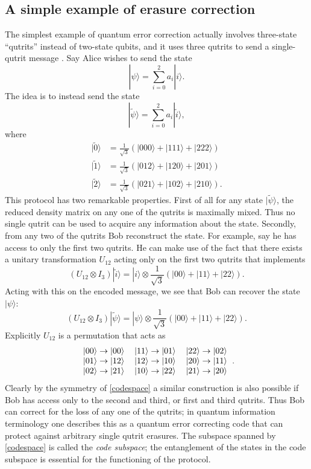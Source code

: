 \documentclass[11pt]{article}
\newcommand{\be}{\begin{equation}}
\newcommand{\ee}{\end{equation}}
\newcommand{\ran}{\rangle}
\newcommand{\wt}{\widetilde}
\begin{document}
\subsection{A simple example of erasure correction}\label{examplesec}
The simplest example of quantum error correction actually involves three-state ``qutrits'' instead of two-state qubits, and it uses three qutrits to send a single-qutrit message \cite{Cleve:1999qg}.  Say Alice wishes to send the state
\be
|\psi\ran=\sum_{i=0}^2 a_i |i\ran.  
\ee
The idea is to instead send the state
\be
|\wt{\psi}\ran=\sum_{i=0}^2 a_i |\wt{i}\ran,
\ee
where
\begin{align}\nonumber
|\wt{0}\ran&=\frac{1}{\sqrt{3}}\left(|000\ran+|111\ran+|222\ran\right)\\\label{codespace}
|\wt{1}\ran&=\frac{1}{\sqrt{3}}\left(|012\ran+|120\ran+|201\ran\right)\\\nonumber
|\wt{2}\ran&=\frac{1}{\sqrt{3}}\left(|021\ran+|102\ran+|210\ran\right).
\end{align} 
This protocol has two remarkable properties.  First of all for any state $|\wt{\psi}\ran$, the reduced density matrix on any one of the qutrits is maximally mixed.  Thus no single qutrit can be used to acquire any information about the state.  Secondly, from any two of the qutrits Bob  reconstruct the state.  For example, say he has access to only the first two qutrits.  He can make use of the fact that there exists a unitary transformation $U_{12}$ acting only on the first two qutrits that implements 
\be\label{U12}
\left(U_{12}\otimes I_3\right)|\wt{i}\ran=|i\ran\otimes \frac{1}{\sqrt{3}}\left(|00\ran+|11\ran+|22\ran\right).
\ee
Acting with this on the encoded message, we see that Bob can recover the state $|\psi\ran$: 
\be
\left(U_{12}\otimes I_3\right)|\wt{\psi}\ran=|\psi\ran\otimes \frac{1}{\sqrt{3}}\left(|00\ran+|11\ran+|22\ran\right).
\ee
Explicitly $U_{12}$ is a permutation that acts as
\be
\begin{tabular}{ l c r }
$|00\ran\to|00\ran$ & $|11\ran \to |01\ran$ & $|22\ran\to |02\ran$ \\
$|01\ran \to |12\ran$ & $|12\ran \to |10\ran$ & $|20\ran \to |11\ran$ \\
$|02\ran\to |21\ran$ & $|10\ran\to|22\ran$ & $|21\ran \to |20\ran$ \\
\end{tabular}.
\ee
Clearly by the symmetry of \eqref{codespace} a similar construction is also possible if Bob has access only to the second and third, or first and third qutrits.  Thus Bob can correct for the loss of any one of the qutrits; in quantum information terminology one describes this as a quantum error correcting code that can protect against arbitrary single qutrit erasures.  The subspace spanned by \eqref{codespace} is called the \textit{code subspace}; the entanglement of the states in the code subspace is essential for the functioning of the protocol.
\end{document}
